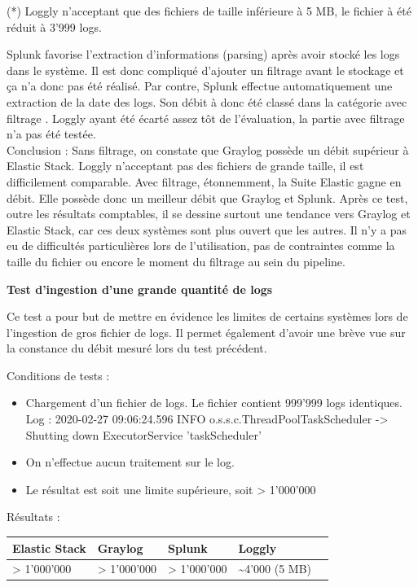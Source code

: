 \documentclass[paper=a4, fontsize=11pt]{scrartcl}
\begin{document}
(*) Loggly n'acceptant que des fichiers de taille inférieure à 5 MB, le fichier à été réduit à 3'999 logs.

Splunk favorise l'extraction d'informations (parsing) après avoir stocké les logs dans le système. Il est donc compliqué d'ajouter un filtrage avant le stockage et ça n'a donc pas été réalisé. Par contre, Splunk effectue automatiquement une extraction de la date des logs. Son débit à donc été classé dans la catégorie \og avec filtrage \fg.
Loggly ayant été écarté assez tôt de l'évaluation, la partie \og avec filtrage \fg n'a pas été testée. \\

Conclusion : Sans filtrage, on constate que Graylog possède un débit supérieur à Elastic Stack. Loggly n'acceptant pas des fichiers de grande taille, il est difficilement comparable. Avec filtrage, étonnemment, la Suite Elastic gagne en débit. Elle possède donc un meilleur débit que Graylog et Splunk.
Après ce test, outre les résultats comptables, il se dessine surtout une tendance vers Graylog et Elastic Stack, car ces deux systèmes sont plus \og ouvert \fg que les autres. Il n'y a pas eu de difficultés particulières lors de l'utilisation, pas de contraintes comme la taille du fichier ou encore le moment du filtrage au sein du pipeline.

\textbf{Test d'ingestion d'une grande quantité de logs}

Ce test a pour but de mettre en évidence les limites de certains systèmes lors de l'ingestion de gros fichier de logs. Il permet également d'avoir une brève vue sur la constance du débit mesuré lors du test précédent.

Conditions de tests :
\begin{itemize}
    \item Chargement d'un fichier de logs.
    \subitem Le fichier contient 999'999 logs identiques.
    \subitem Log : 2020-02-27 09:06:24.596 INFO o.s.s.c.ThreadPoolTaskScheduler -> Shutting down ExecutorService ’taskScheduler’
    \item On n'effectue aucun traitement sur le log.
    \item Le résultat est soit une limite supérieure, soit \og > 1'000'000 \fg
\end{itemize}

Résultats : 

\centering
\begin{tabular}{ |p{3cm}|p{3cm}|p{3cm}|p{3cm}|p{3cm}|  }
    \hline
    Elastic Stack & Graylog & Splunk & Loggly \\
    \hline
    > 1'000'000 & > 1'000'000 & > 1'000'000 & \textasciitilde 4'000 (5 MB) \\
    \hline
\end{tabular}
\justify
\end{document}
